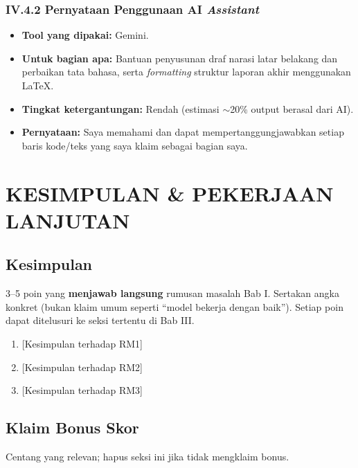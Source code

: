 \documentclass[11pt,a4paper,oneside]{report}
\begin{document}
\subsection*{IV.4.2 Pernyataan Penggunaan AI \textit{Assistant}}
\begin{itemize}[leftmargin=*]
    \item \textbf{Tool yang dipakai:} Gemini.
    \item \textbf{Untuk bagian apa:} Bantuan penyusunan draf narasi latar belakang dan perbaikan tata bahasa, serta \textit{formatting} struktur laporan akhir menggunakan LaTeX.
    \item \textbf{Tingkat ketergantungan:} Rendah (estimasi $\sim$20\% output berasal dari AI).
    \item \textbf{Pernyataan:} Saya memahami dan dapat mempertanggungjawabkan setiap baris kode/teks yang saya klaim sebagai bagian saya.
\end{itemize}

\chapter{KESIMPULAN \& PEKERJAAN LANJUTAN}
\label{bab:kesimpulan}

\section{Kesimpulan}
\begin{petunjuk}
3--5 poin yang \textbf{menjawab langsung} rumusan masalah Bab I. Sertakan angka konkret (bukan klaim umum seperti ``model bekerja dengan baik''). Setiap poin dapat ditelusuri ke seksi tertentu di Bab III.
\end{petunjuk}

\begin{enumerate}[leftmargin=*]
    \item {[Kesimpulan terhadap RM1]}
    \item {[Kesimpulan terhadap RM2]}
    \item {[Kesimpulan terhadap RM3]}
\end{enumerate}

\section{Klaim Bonus Skor}
\begin{petunjuk}
Centang yang relevan; hapus seksi ini jika tidak mengklaim bonus.
\end{petunjuk}
\end{document}
